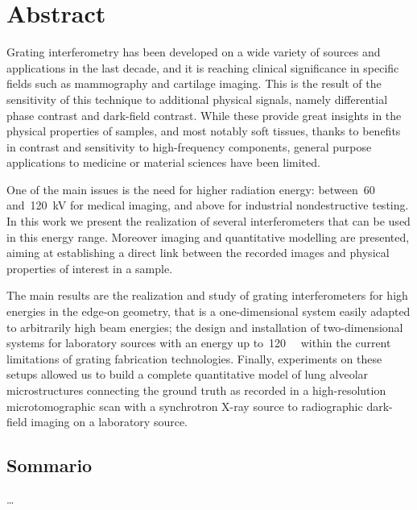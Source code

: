 \begingroup
\let\clearpage\relax
\let\cleardoublepage\relax
\let\cleardoublepage\relax

\chapter*{Abstract}
Grating interferometry has been developed on a wide variety of sources and
applications in the last decade, and it is reaching clinical significance in
specific fields such as mammography and cartilage imaging. This is the
result of the sensitivity of this technique to additional physical signals,
namely differential phase contrast and dark-field contrast. While these
provide great insights in the physical properties of samples, and most
notably soft tissues, thanks to benefits in contrast and sensitivity to
high-frequency components, general purpose applications to medicine or
material sciences have been limited.

One of the main issues is the need for higher radiation energy:
between~\num{60} and~\SI{120}{\kilo\volt} for medical imaging, and above for
industrial nondestructive testing. In this work we present the realization
of several interferometers that can be used in this energy range. Moreover
imaging and quantitative modelling are presented, aiming at establishing a
direct link between the recorded images and physical properties of interest
in a sample.

The main results are the realization and study of grating interferometers for
high energies in the edge-on geometry, that is a one-dimensional system
easily adapted to arbitrarily high beam energies; the design and
installation of
two-dimensional systems for laboratory sources with an energy up
to~\SI{120}{\kilo\voltpeak} within the current limitations of grating
fabrication technologies. Finally, experiments on these setups allowed us
to build a complete quantitative model of lung alveolar
microstructures connecting the ground truth as recorded in a high-resolution
microtomographic scan with a synchrotron X-ray source to radiographic
dark-field imaging on a laboratory source.

\newpage

\begin{otherlanguage}{italian}
\chapter*{Sommario}
\dots
\end{otherlanguage}

\endgroup

\vfill
